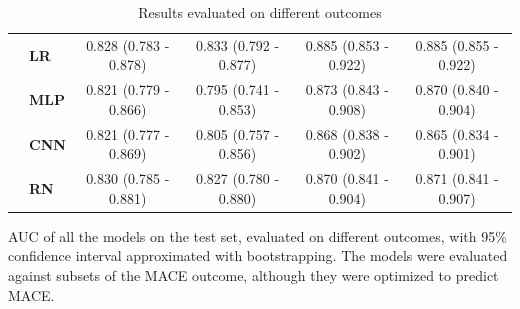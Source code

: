\documentclass[preprint]{elsarticle}
\begin{document}
\begin{table}[H]
\begin{adjustbox}{center}
\begin{tabular}{@{}llcccc@{}}
& \textbf{LR} & 0.828 (0.783 - 0.878) & 0.833 (0.792 - 0.877) & 0.885 (0.853 - 0.922) & 0.885 (0.855 - 0.922) \\
& \textbf{MLP} & 0.821 (0.779 - 0.866) & 0.795 (0.741 - 0.853) & 0.873 (0.843 - 0.908) & 0.870 (0.840 - 0.904) \\
& \textbf{CNN} & 0.821 (0.777 - 0.869) & 0.805 (0.757 - 0.856) & 0.868 (0.838 - 0.902) & 0.865 (0.834 - 0.901) \\
& \textbf{RN} & 0.830 (0.785 - 0.881) & 0.827 (0.780 - 0.880) & 0.870 (0.841 - 0.904) & 0.871 (0.841 - 0.907) \\

\bottomrule
\end{tabular}
\end{adjustbox}
\caption{Results evaluated on different outcomes}
\medskip
\small
AUC of all the models on the test set, evaluated on different outcomes, with 95\% confidence interval approximated with bootstrapping. The models were evaluated against subsets of the MACE outcome, although they were optimized to predict MACE. 
\label{table:appendix:outcomes}
\end{table}
\renewcommand{\arraystretch}{1}
\end{document}
